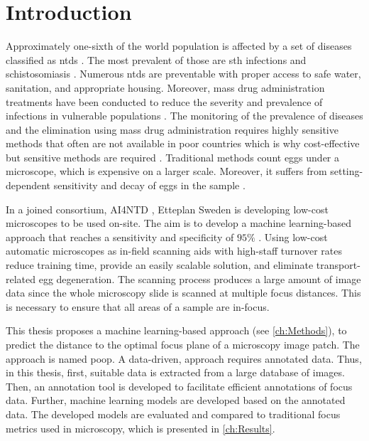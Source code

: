 \chapter{Introduction}
\label{ch:Introduction}

Approximately one-sixth of the world population is affected by a set of diseases classified as \acfp{ntd} \cite{feasey2010neglected}. The most prevalent of those are \acf{sth} infections and schistosomiasis \cite{barenbold2017estimating}. Numerous \acp{ntd} are preventable with proper access to safe water, sanitation, and appropriate housing. Moreover, mass drug administration treatments have been conducted to reduce the severity and prevalence of infections in vulnerable populations \cite{jourdan2018soiltransmitted}. The monitoring of the prevalence of diseases and the elimination using mass drug administration requires highly sensitive methods that often are not available in poor countries which is why cost-effective but sensitive methods are required \cite{mbongngwese2020diagnostic}.
Traditional methods count eggs under a microscope, which is expensive on a larger scale. Moreover, it suffers from setting-dependent sensitivity and decay of eggs in the sample \cite{barenbold2017estimating}. 

In a joined consortium, AI4NTD \cite{ai4ntd2021developing}, Etteplan Sweden \cite{etteplanoyjengineering} is developing low-cost microscopes to be used on-site. The aim is to develop a machine learning-based approach that reaches a sensitivity and specificity of $95 \%$ 
\cite{etteplan2021fighting}. Using low-cost automatic microscopes as in-field scanning aids with high-staff turnover rates reduce training time, provide an easily scalable solution, and eliminate transport-related egg degeneration.
The scanning process produces a large amount of image data since the whole microscopy slide is scanned at multiple focus distances. This is necessary to ensure that all areas of a sample are in-focus.

This thesis proposes a machine learning-based approach (see \autoref{ch:Methods}), to predict the distance to the optimal focus plane of a microscopy image patch. The approach is named \ac{poop}. A data-driven, approach requires annotated data. Thus, in this thesis, first, suitable data is extracted from a large database of images. Then, an annotation tool is developed to facilitate efficient annotations of focus data. Further, machine learning models are developed based on the annotated data. The developed models are evaluated and compared to traditional focus metrics used in microscopy, which is presented in \autoref{ch:Results}.

